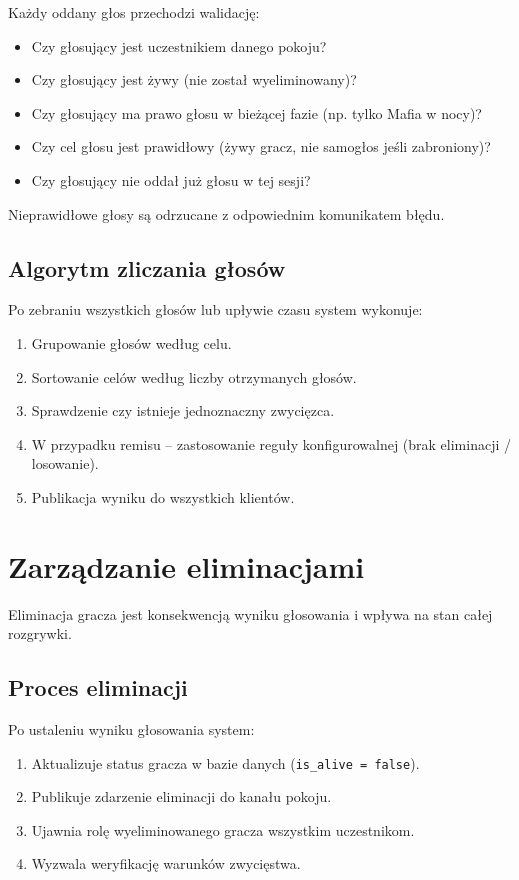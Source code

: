 ﻿\documentclass[a4paper,twoside,11pt]{mwrep}
\theoremstyle{plain} \newtheorem{thm}{Twierdzenie}
\theoremstyle{plain} \newtheorem{lem}{Lemat}
\theoremstyle{definition} \newtheorem{defn}{Definicja}
\theoremstyle{remark} \newtheorem*{rem}{Wniosek}
\begin{document}
Każdy oddany głos przechodzi walidację:
\begin{itemize}
    \item Czy głosujący jest uczestnikiem danego pokoju?
    \item Czy głosujący jest żywy (nie został wyeliminowany)?
    \item Czy głosujący ma prawo głosu w bieżącej fazie (np. tylko Mafia w nocy)?
    \item Czy cel głosu jest prawidłowy (żywy gracz, nie samogłos jeśli zabroniony)?
    \item Czy głosujący nie oddał już głosu w tej sesji?
\end{itemize}

Nieprawidłowe głosy są odrzucane z odpowiednim komunikatem błędu.

\subsection{Algorytm zliczania głosów}

Po zebraniu wszystkich głosów lub upływie czasu system wykonuje:
\begin{enumerate}
    \item Grupowanie głosów według celu.
    \item Sortowanie celów według liczby otrzymanych głosów.
    \item Sprawdzenie czy istnieje jednoznaczny zwycięzca.
    \item W przypadku remisu -- zastosowanie reguły konfigurowalnej (brak eliminacji / losowanie).
    \item Publikacja wyniku do wszystkich klientów.
\end{enumerate}

\section{Zarządzanie eliminacjami}

Eliminacja gracza jest konsekwencją wyniku głosowania i wpływa na stan całej rozgrywki.

\subsection{Proces eliminacji}

Po ustaleniu wyniku głosowania system:
\begin{enumerate}
    \item Aktualizuje status gracza w bazie danych (\texttt{is\_alive = false}).
    \item Publikuje zdarzenie eliminacji do kanału pokoju.
    \item Ujawnia rolę wyeliminowanego gracza wszystkim uczestnikom.
    \item Wyzwala weryfikację warunków zwycięstwa.
\end{enumerate}
\end{document}
